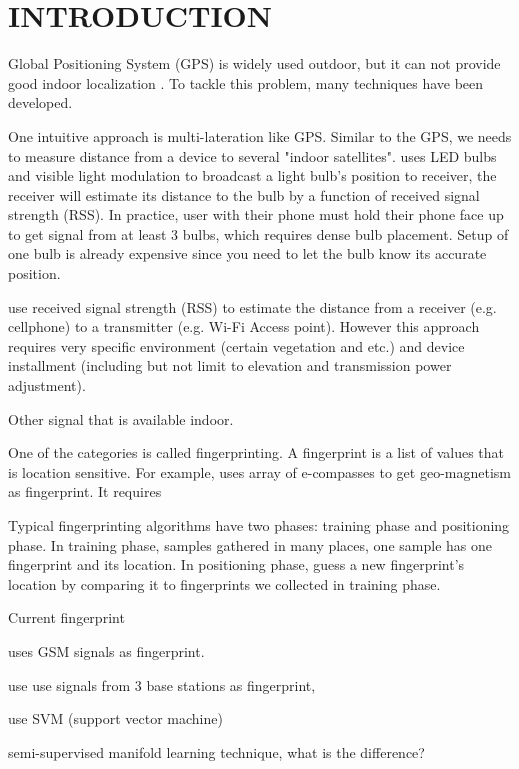 \chapter{INTRODUCTION}

Global Positioning System (GPS) is widely used outdoor, but it can not provide good indoor localization \cite{pulkkinen2011semi, varshavsky2007gsm}. To tackle this problem, many techniques have been developed. 

One intuitive approach is multi-lateration like GPS. Similar to the GPS, we needs to measure distance from a device to several "indoor satellites". \cite{hu2013pharos} uses LED bulbs and visible light modulation to broadcast a light bulb's position to receiver, the receiver will estimate its distance to the bulb by a function of received signal strength (RSS). In practice, user with their phone must hold their phone face up to get signal from at least 3 bulbs, which requires dense bulb placement. Setup of one bulb is already expensive since you need to let the bulb know its accurate position. 

\cite{whitehouse2007practical} use received signal strength (RSS) to estimate the distance from a receiver (e.g. cellphone) to a transmitter (e.g. Wi-Fi Access point). However this approach requires very specific environment (certain vegetation and etc.) and device installment (including but not limit to elevation and transmission power adjustment). 

Other signal that is available indoor.
 
One of the categories is called fingerprinting. A fingerprint is a list of values that is location sensitive. For example, \cite{chung2011indoor} uses array of e-compasses to get geo-magnetism as fingerprint. It requires  

Typical fingerprinting algorithms have two phases: training phase and positioning phase. In training phase, samples gathered in many places, one sample has one fingerprint and its location. In positioning phase, guess a new fingerprint's location by comparing it to fingerprints we collected in training phase. 

Current fingerprint 


\cite{varshavsky2007gsm} uses GSM signals as fingerprint. 

\cite{bahl2000radar} use use signals from 3 base stations as fingerprint,

\cite{brunato2005statistical} use SVM (support vector machine)

\cite{pulkkinen2011semi}semi-supervised manifold learning technique, what is the difference? 

